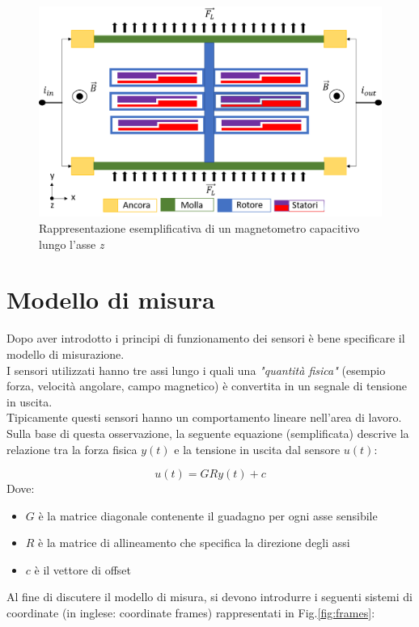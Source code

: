  \begin{figure}[H]  
	\centering 
	\includegraphics[scale=0.4 ]{tecnologie/magnet.png}
	\caption{Rappresentazione esemplificativa di un magnetometro capacitivo lungo l'asse \textit{z}}
	\label{fig:magnet}
\end{figure}


\section{Modello di misura}
\label{modello_di_misura}
Dopo aver introdotto i principi di funzionamento dei sensori è bene specificare il modello di misurazione.\\
I sensori utilizzati hanno tre assi lungo i quali una \textit{"quantità fisica"} (esempio forza, velocità angolare, campo magnetico) è convertita in un segnale di tensione in uscita. \\
Tipicamente questi sensori hanno un comportamento lineare nell'area di lavoro. Sulla base di questa osservazione, la seguente equazione (semplificata) descrive la relazione tra la forza fisica $y(t)$ e la tensione in uscita dal sensore $ u(t)$:

\begin{equation}
    u(t) = G R y(t) + c
\end{equation}
Dove:
\begin{itemize}
	\item $G$ è la matrice diagonale contenente il guadagno per ogni asse sensibile
	\item $R$ è la matrice di allineamento che specifica la direzione degli assi
	\item $c$ è il vettore di offset 
\end{itemize}
Al fine di discutere il modello di misura, si devono introdurre i seguenti sistemi di coordinate (in inglese: coordinate frames) rappresentati in Fig.\ref{fig:frames}:

